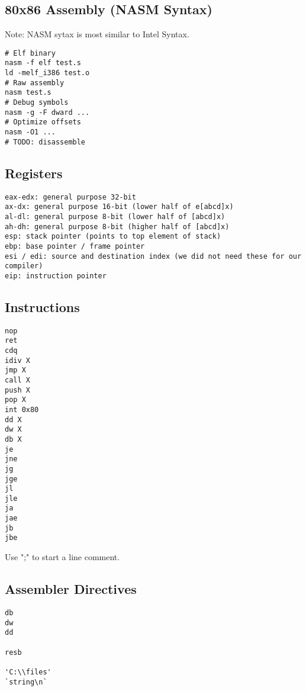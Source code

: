 \documentclass[8pt]{article}
\begin{document}
\begin{multicols}{5}

\section*{80x86 Assembly (NASM Syntax)}

Note: NASM sytax is most similar to Intel Syntax.

\begin{lstlisting}
# Elf binary
nasm -f elf test.s
ld -melf_i386 test.o
# Raw assembly
nasm test.s
# Debug symbols
nasm -g -F dward ...
# Optimize offsets
nasm -O1 ...
# TODO: disassemble
\end{lstlisting}

\subsection*{Registers}

\begin{lstlisting}
eax-edx: general purpose 32-bit
ax-dx: general purpose 16-bit (lower half of e[abcd]x)
al-dl: general purpose 8-bit (lower half of [abcd]x)
ah-dh: general purpose 8-bit (higher half of [abcd]x)
esp: stack pointer (points to top element of stack)
ebp: base pointer / frame pointer
esi / edi: source and destination index (we did not need these for our compiler)
eip: instruction pointer
\end{lstlisting}


\subsection*{Instructions}

\begin{lstlisting}
nop
ret
cdq
idiv X
jmp X
call X
push X
pop X
int 0x80
dd X
dw X
db X
je
jne
jg
jge
jl
jle
ja
jae
jb
jbe
\end{lstlisting}

Use ";" to start a line comment.

\subsection*{Assembler Directives}

\begin{lstlisting}
db
dw
dd

resb

'C:\\files'
`string\n`


\end{lstlisting}
\end{multicols}
\end{document}

